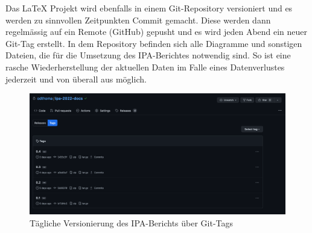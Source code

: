 Das LaTeX Projekt wird ebenfalls in einem Git-Repository versioniert und es werden zu sinnvollen Zeitpunkten Commit gemacht. Diese werden dann regelmässig auf ein Remote (GitHub) gepusht und es wird jeden Abend ein neuer Git-Tag erstellt.
In dem Repository befinden sich alle Diagramme und sonstigen Dateien, die für die Umsetzung des IPA-Berichtes notwendig sind. 
So ist eine rasche Wiederherstellung der aktuellen Daten im Falle eines Datenverlustes jederzeit und von überall aus möglich.

\begin{figure}[H]
    \centering
    \includegraphics[width=14cm]{images/latex-github-tags.png}
    \caption{\label{fig:latex-github-tags}Tägliche Versionierung des IPA-Berichts über Git-Tags}
\end{figure}
